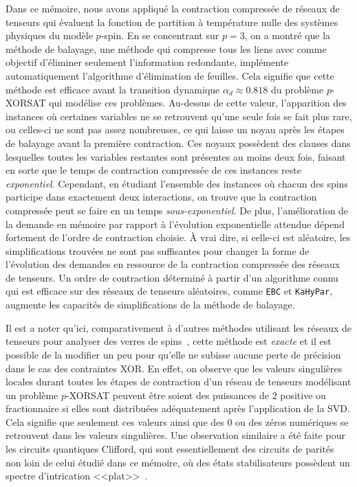 \begin{comment}
\end{comment}

\Conclusion %

Dans ce mémoire, nous avons appliqué la contraction compressée de réseaux de tenseurs qui évaluent la fonction de partition à température nulle des systèmes physiques du modèle $p$-spin.
En se concentrant sur $p = 3$, on a montré que la méthode de balayage, une méthode qui compresse tous les liens avec comme objectif d'éliminer seulement l'information redondante, implémente automatiquement l'algorithme d'élimination de feuilles.
Cela signifie que cette méthode est efficace avant la transition dynamique $\alpha_d \approx 0.818$ du problème $p$-XORSAT qui modélise ces problèmes.
Au-dessus de cette valeur, l'apparition des instances où certaines variables ne se retrouvent qu'une seule fois se fait plus rare, ou celles-ci ne sont pas assez nombreuses, ce qui laisse un noyau après les étapes de balayage avant la première contraction.
Ces noyaux possèdent des clauses dans lesquelles toutes les variables restantes sont présentes au moins deux fois, faisant en sorte que le temps de contraction compressée de ces instances reste \emph{exponentiel}.
Cependant, en étudiant l'ensemble des instances où chacun des spins participe dans exactement deux interactions, on trouve que la contraction compressée peut se faire en un temps \emph{sous-exponentiel}.
De plus, l'amélioration de la demande en mémoire par rapport à l'évolution exponentielle attendue dépend fortement de l'ordre de contraction choisie.
À vrai dire, si celle-ci est aléatoire, les simplifications trouvées ne sont pas suffisantes pour changer la forme de l'évolution des demandes en ressource de la contraction compressée des réseaux de tenseurs.
Un ordre de contraction déterminé à partir d'un algorithme connu qui est efficace sur des réseaux de tenseurs aléatoires, comme \verb|EBC| et \verb|KaHyPar|, augmente les capacités de simplifications de la méthode de balayage.

Il est a noter qu'ici, comparativement à d'autres méthodes utilisant les réseaux de tenseurs pour analyser des verres de spins~\cite{zhu2019tensor}, cette méthode est \emph{exacte} et il est possible de la modifier un peu pour qu'elle ne subisse aucune perte de précision dans le cas des contraintes XOR.
En effet, on observe que les valeurs singulières locales durant toutes les étapes de contraction d'un réseau de tenseurs modélisant un problème $p$-XORSAT peuvent être soient des puissances de $2$ positive ou fractionnaire si elles sont distribuées adéquatement après l'application de la SVD.
Cela signifie que seulement ces valeurs ainsi que des $0$ ou des zéros numériques se retrouvent dans les valeurs singulières.
Une observation similaire a été faite pour les circuits quantiques Clifford, qui sont essentiellement des circuits de parités non loin de celui étudié dans ce mémoire, où des états stabilisateurs possèdent un spectre d'intrication <<plat>>~\cite{fattal2004entanglement, Hamma2005entropy, zhou2020Clifford}.

